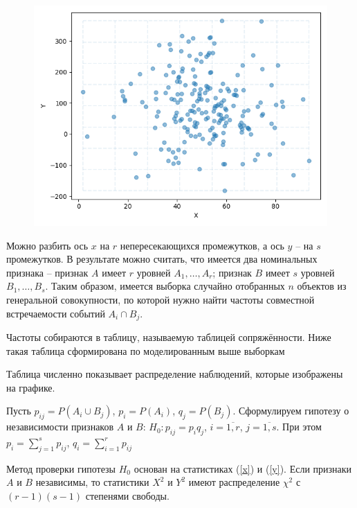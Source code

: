 \begin{figure}[H]
	\begin{minipage}[H]{0.9\linewidth}
		\begin{center}
			\includegraphics[width=\linewidth]{figures/scatters}
		\end{center}
	\end{minipage}
\end{figure}

Можно разбить ось $x$ на $r$ непересекающихся промежутков, а ось $y$ -- на $s$ промежутков. В результате можно считать, что имеется два номинальных признака -- признак $A$ имеет $r$ уровней $A_1, \ldots, A_r$; признак $B$ имеет $s$ уровней $B_1, \ldots, B_s$. Таким образом, имеется выборка случайно отобранных $n$ объектов из генеральной совокупности, по которой нужно найти частоты совместной встречаемости событий $A_i \cap B_j$.

Частоты собираются в таблицу, называемую таблицей сопряжённости. Ниже такая таблица сформирована по моделированным выше выборкам


Таблица численно показывает распределение наблюдений, которые изображены на графике.

Пусть $p_{ij} = P(A_i \cup B_j)$, $p_i = P(A_i)$, $q_j = P(B_j)$. Сформулируем гипотезу о независимости признаков $A$ и $B$: $H_0: p_{ij} = p_i q_j$, $i=\overline{1,r}$, $j = \overline{1, s}$. При этом $p_i = \sum\limits_{j=1}^s p_{ij}$, $q_i = \sum\limits_{i=1}^r p_{ij}$

Метод проверки гипотезы $H_0$ основан на статистиках (\ref{x}) и (\ref{y}). Если признаки $A$ и $B$ независимы, то статистики $X^2$ и $Y^2$ имеют распределение $\chi^2$ с $(r - 1)(s - 1)$ степенями свободы.

